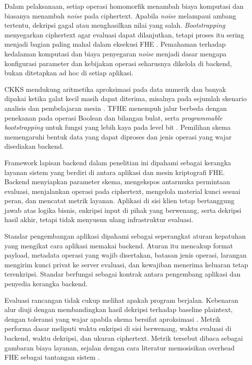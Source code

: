 \documentclass[12pt,a4paper,oneside]{report}
\begin{document}
Dalam pelaksanaan, setiap operasi homomorfik menambah biaya komputasi dan biasanya menambah \emph{noise} pada ciphertext. Apabila \emph{noise} melampaui ambang tertentu, dekripsi gagal atau menghasilkan nilai yang salah. \emph{Bootstrapping} menyegarkan ciphertext agar evaluasi dapat dilanjutkan, tetapi proses itu sering menjadi bagian paling mahal dalam eksekusi FHE \cite{li2026bootstrappingSurvey}. Pemahaman terhadap kedalaman komputasi dan biaya penyegaran \emph{noise} menjadi dasar mengapa konfigurasi parameter dan kebijakan operasi seharusnya dikelola di backend, bukan ditetapkan ad hoc di setiap aplikasi.

CKKS mendukung aritmetika aproksimasi pada data numerik dan banyak dipakai ketika galat kecil masih dapat diterima, misalnya pada sejumlah skenario analisis dan pembelajaran mesin \cite{wu2025ckksSurvey,vinko2026secureByDesign}. TFHE menempuh jalur berbeda dengan penekanan pada operasi Boolean dan bilangan bulat, serta \emph{programmable bootstrapping} untuk fungsi yang lebih kaya pada level bit \cite{peker2025confidentialStatisticalFhe}. Pemilihan skema memengaruhi bentuk data yang dapat diproses dan jenis operasi yang wajar disediakan backend.

Framework lapisan backend dalam penelitian ini dipahami sebagai kerangka layanan sistem yang berdiri di antara aplikasi dan mesin kriptografi FHE. Backend menyiapkan parameter skema, mengekspos antarmuka permintaan evaluasi, menjalankan operasi pada ciphertext, mengelola material kunci sesuai peran, dan mencatat metrik layanan. Aplikasi di sisi klien tetap bertanggung jawab atas logika bisnis, enkripsi input di pihak yang berwenang, serta dekripsi hasil akhir, tetapi tidak menyusun ulang infrastruktur evaluasi.

Standar pengembangan aplikasi dipahami sebagai seperangkat aturan kepatuhan yang mengikat cara aplikasi memakai backend. Aturan itu mencakup format payload, metadata operasi yang wajib disertakan, batasan jenis operasi, larangan mengirim kunci privat ke server evaluasi, dan kewajiban menerima keluaran tetap terenkripsi. Standar berfungsi sebagai kontrak antara pengembang aplikasi dan penyedia kerangka backend.

Evaluasi rancangan tidak cukup melihat apakah program berjalan. Kebenaran alur diuji dengan membandingkan hasil dekripsi terhadap baseline plaintext, dengan toleransi yang wajar apabila skema bersifat aproksimasi \cite{vinko2026secureByDesign}. Metrik performa dasar meliputi waktu enkripsi di sisi berwenang, waktu evaluasi di backend, waktu dekripsi, dan ukuran ciphertext. Metrik tersebut dibaca sebagai gambaran biaya layanan, sejalan dengan cara literatur memosisikan overhead FHE sebagai tantangan sistem \cite{li2026bootstrappingSurvey,fan2026gpuFhe,lee2025clusterFhe}.
\end{document}
